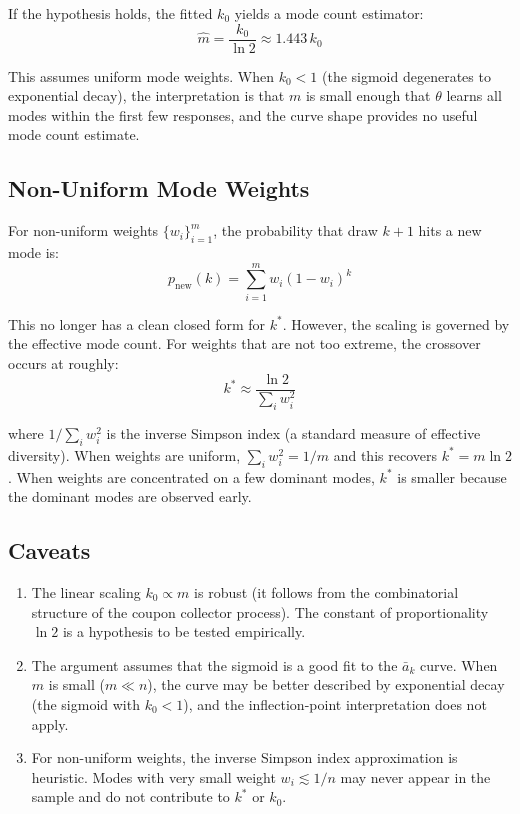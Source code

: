 \documentclass[11pt]{article}
\begin{document}
If the hypothesis holds, the fitted $k_0$ yields a mode count estimator:
\begin{equation}
    \hat{m} = \frac{k_0}{\ln 2} \approx 1.443\, k_0
\end{equation}

This assumes uniform mode weights. When $k_0 < 1$ (the sigmoid degenerates to exponential decay), the interpretation is that $m$ is small enough that $\theta$ learns all modes within the first few responses, and the curve shape provides no useful mode count estimate.

\subsection*{Non-Uniform Mode Weights}

For non-uniform weights $\{w_i\}_{i=1}^m$, the probability that draw $k+1$ hits a new mode is:
\begin{equation}
    p_{\mathrm{new}}(k) = \sum_{i=1}^{m} w_i \left(1 - w_i\right)^{k}
\end{equation}

This no longer has a clean closed form for $k^*$. However, the scaling is governed by the effective mode count. For weights that are not too extreme, the crossover occurs at roughly:
\begin{equation}
    k^* \approx \frac{\ln 2}{\sum_i w_i^2}
\end{equation}

where $1/\sum_i w_i^2$ is the inverse Simpson index (a standard measure of effective diversity). When weights are uniform, $\sum_i w_i^2 = 1/m$ and this recovers $k^* = m \ln 2$. When weights are concentrated on a few dominant modes, $k^*$ is smaller because the dominant modes are observed early.

\subsection*{Caveats}

\begin{enumerate}
    \item The linear scaling $k_0 \propto m$ is robust (it follows from the combinatorial structure of the coupon collector process). The constant of proportionality $\ln 2$ is a hypothesis to be tested empirically.

    \item The argument assumes that the sigmoid is a good fit to the $\bar{a}_k$ curve. When $m$ is small ($m \ll n$), the curve may be better described by exponential decay (the sigmoid with $k_0 < 1$), and the inflection-point interpretation does not apply.

    \item For non-uniform weights, the inverse Simpson index approximation is heuristic. Modes with very small weight $w_i \lesssim 1/n$ may never appear in the sample and do not contribute to $k^*$ or $k_0$.
\end{enumerate}
\end{document}
